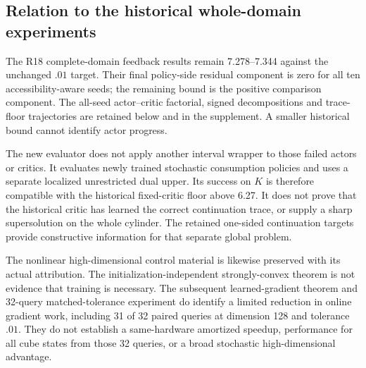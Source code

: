 \subsection{Relation to the historical whole-domain experiments}
The R18 complete-domain feedback results remain 7.278--7.344 against the unchanged $.01$ target. Their final policy-side residual component is zero for all ten accessibility-aware seeds; the remaining bound is the positive comparison component. The all-seed actor--critic factorial, signed decompositions and trace-floor trajectories are retained below and in the supplement. A smaller historical bound cannot identify actor progress.

The new evaluator does not apply another interval wrapper to those failed actors or critics. It evaluates newly trained stochastic consumption policies and uses a separate localized unrestricted dual upper. Its success on $K$ is therefore compatible with the historical fixed-critic floor above 6.27. It does not prove that the historical critic has learned the correct continuation trace, or supply a sharp supersolution on the whole cylinder. The retained one-sided continuation targets provide constructive information for that separate global problem.

The nonlinear high-dimensional control material is likewise preserved with its actual attribution. The initialization-independent strongly-convex theorem is not evidence that training is necessary. The subsequent learned-gradient theorem and 32-query matched-tolerance experiment do identify a limited reduction in online gradient work, including 31 of 32 paired queries at dimension 128 and tolerance $.01$. They do not establish a same-hardware amortized speedup, performance for all cube states from those 32 queries, or a broad stochastic high-dimensional advantage.
